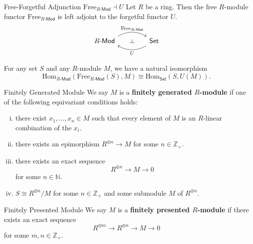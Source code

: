 \begin{proposition}{Free-Forgetful Adjunction $\mathrm{Free}_{R\text{-}\mathsf{Mod}}\dashv U$}{}
    Let $R$ be a ring. Then the free $R$-module functor $\mathrm{Free}_{R\text{-}\mathsf{Mod}}$ is left adjoint to the forgetful functor $U$.
    \[
        \begin{tikzcd}[ampersand replacement=\&]
            R\text{-}\mathsf{Mod} \arrow[r, "\mathrm{Free}_{R\text{-}\mathsf{Mod}}"{name=U}, bend left, start anchor=east, yshift=1.7ex, end anchor=west] \&[+18pt] 
            \mathsf{Set} \arrow[l, "{U}"{name=D, anchor=north}, bend left, start anchor=west, yshift=-1.5ex, end anchor=east]
            \arrow[phantom, from=U, to=D, "\dashv"{rotate=-90}]
        \end{tikzcd}    
    \]
    
    For any set $S$ and any $R$-module $M$, we have a natural isomorphism
    \[
        \mathrm{Hom}_{R\text{-}\mathsf{Mod}}\left(\mathrm{Free}_{R\text{-}\mathsf{Mod}}(S), M\right)\cong \mathrm{Hom}_{\mathsf{Set}}\left(S, U(M)\right).
    \]
\end{proposition}





\begin{definition}{Finitely Generated Module}{}
    We say $M$ is a \textbf{finitely generated $R$-module} if 
    one of the following equivariant conditions holds:
    \begin{enumerate}[(i)]
        \item there exist $x_1, \ldots, x_n \in M$ such that every element of $M$ is an $R$-linear combination of the $x_i$. 
        \item there exists an epimorphism $R^{\oplus n} \rightarrow M$ for some $n \in \mathbb{Z}_+$.
        \item there exists an exact sequence
        \[
        R^{\oplus n}  \rightarrow M \rightarrow 0
        \]
        for some $n\in \mathbb{N}$.
        \item $S\cong R^{\oplus n}/M$ for some $n\in \mathbb{Z}_+$ and some submodule $M$ of $R^{\oplus n}$.
    \end{enumerate}
\end{definition}

\begin{definition}{Finitely Presented Module}{}
    We say $M$ is a \textbf{finitely presented $R$-module} if 
    there exists an exact sequence
    \[
    R^{\oplus m} \rightarrow R^{\oplus n} \rightarrow M \rightarrow 0
    \]
    for some $m, n\in \mathbb{Z}_+$.
\end{definition}


